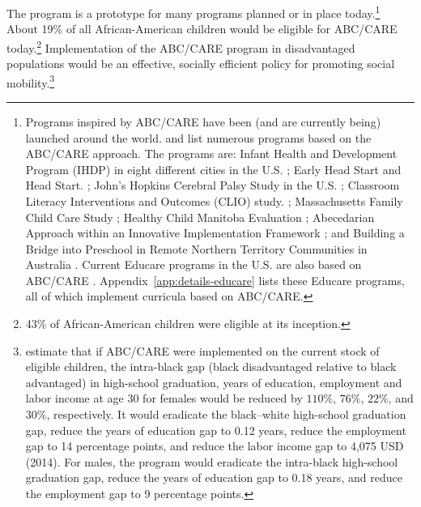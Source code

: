 The program is a prototype for many programs planned or in place today.\footnote{Programs inspired by ABC/CARE have been (and are currently being) launched around the world. \citet{Sparling_2010_Highlights} and \citet{Ramey_Ramey_Lanzi_2014_Interventions} list numerous programs based on the ABC/CARE approach. The programs are: Infant Health and Development Program (IHDP) in eight different cities in the U.S. \citep{Spiker-etal_1997_Helping}; Early Head Start and Head Start. \citep{Schneider_McDonald-eds_2007_Scale-Up_Vol-1}; John's Hopkins Cerebral Palsy Study in the U.S. \citep{Sparling_2010_Highlights}; Classroom Literacy Interventions and Outcomes (CLIO) study. \citep{Sparling_2010_Highlights}; Massachusetts Family Child Care Study \citep{Collins_etal_2010_Massachusetts-Study}; Healthy Child Manitoba Evaluation \citep{Healthy_Child_Manitoba_2015_Starting-Early}; Abecedarian Approach within an Innovative Implementation Framework \citep{Jensen_Nielsen_2016_ABC-Programme-Pilot}; and Building a Bridge into Preschool in Remote Northern Territory Communities in Australia \citep{UMonash_Dataset_2015_URL}. Current Educare programs in the U.S. are also based on ABC/CARE \citep{Educare_2014_Research_Agenda,Yazejian_Bryant_2012_Educare}. Appendix~\ref{app:details-educare} lists these Educare programs, all of which implement curricula based on ABC/CARE.} About 19\% of all African-American children would be eligible for ABC/CARE today.\footnote{43\% of African-American children were eligible at its inception.} Implementation of the ABC/CARE program in disadvantaged populations would be an effective, socially efficient policy for promoting social mobility.\footnote{\citet{Garcia_2016_National-Implementation-ECI} estimate that if ABC/CARE were implemented on the current stock of eligible children, the intra-black gap (black disadvantaged relative to black advantaged) in high-school graduation, years of education, employment and labor income at age 30 for females would be reduced by $110\%$, $76\%$, $22\%$, and $30\%$, respectively. It would eradicate the black--white high-school graduation gap, reduce the years of education gap to 0.12 years, reduce the employment gap to 14 percentage points, and reduce the labor income gap to 4,075 USD (2014). For males, the program would eradicate the intra-black high-school graduation gap, reduce the years of education gap to 0.18 years, and reduce the employment gap to 9 percentage points.}

